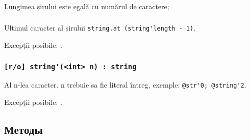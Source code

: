\subsubsection{}

Lungimea șirului este egală cu numărul de caractere;

\subsubsection{}

Ultimul caracter al șirului \lstinline|string.at (string'length - 1)|.

Excepții posibile: .

\subsubsection{\lstinline|[r/o] string'(<int> n) : string|}

Al n-lea caracter. n trebuie sa fie literal întreg, exemple: \lstinline|@str'0; @string'2|.

Excepții posibile: .

\subsection{Методы}

